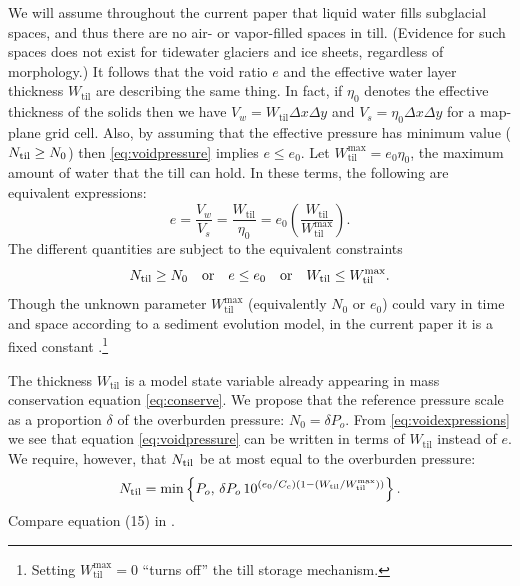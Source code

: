 \documentclass[11pt,final]{amsart}
\newcommand{\Wtil}{W_{\text{til}}}
\newcommand{\Wtilmax}{W_{\text{til}}^{\text{max}}}
\begin{document}
We will assume throughout the current paper that liquid water fills subglacial spaces, and thus there are no air- or vapor-filled spaces in till.  (Evidence for such spaces does not exist for tidewater glaciers and ice sheets, regardless of morphology.)  It follows that the void ratio $e$ and the effective water layer thickness $\Wtil$ are describing the same thing.  In fact, if $\eta_0$ denotes the effective thickness of the solids then we have $V_w = \Wtil \Delta x \Delta y$ and $V_s = \eta_0 \Delta x \Delta y$ for a map-plane grid cell.  Also, by assuming that the effective pressure has minimum value ($N_{\text{til}} \ge N_0$) then \eqref{eq:voidpressure} implies $e \le e_0$.  Let $\Wtilmax = e_0 \eta_0$, the maximum amount of water that the till can hold.  In these terms, the following are equivalent expressions:
\begin{equation}
e = \frac{V_w}{V_s} = \frac{\Wtil}{\eta_0} = e_0 \left(\frac{\Wtil}{\Wtilmax}\right). \label{eq:voidexpressions}
\end{equation}
The different quantities are subject to the equivalent constraints
\begin{equation}
\Ntil \ge N_0 \quad \text{or} \quad e\le e_0 \quad \text{or} \quad \Wtil \le \Wtilmax. \label{eq:Wtilupperbound}
\end{equation}
Though the unknown parameter $\Wtilmax$ (equivalently $N_0$ or $e_0$) could vary in time and space according to a sediment evolution model, in the current paper it is a fixed constant \citep{BBssasliding,TrufferEchelmeyerHarrison2001}.\footnote{Setting $\Wtilmax=0$ ``turns off'' the till storage mechanism.}

The thickness $\Wtil$ is a model state variable already appearing in mass conservation equation \eqref{eq:conserve}.  We propose that the reference pressure scale as a proportion $\delta$ of the overburden pressure: $N_0 = \delta P_o$.  From \eqref{eq:voidexpressions} we see that equation \eqref{eq:voidpressure} can be written in terms of $\Wtil$ instead of $e$.  We require, however, that $N_{\text{til}}$ be at most equal to the overburden pressure:
\begin{equation}
\Ntil = \min\left\{P_o,\, \delta P_o \, 10^{(e_0/C_c) \left(1 - (\Wtil/\Wtilmax)\right)}\right\}. \label{eq:Wtilpressure}
\end{equation}
Compare equation (15) in \cite{vanderWeletal2013}.
\end{document}
